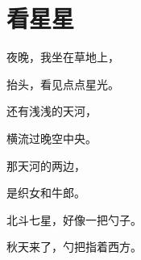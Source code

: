 \documentclass[12pt,UTF-8,openany]{ctexbook}
\begin{document}
\hanzibox{}\hanzibox{}\hanzibox{}\hanzibox{}\hspace{1em}\hanzibox{}\hanzibox{}\hanzibox{}\hanzibox{}

\hanzibox{}\hanzibox{}\hanzibox{}\hanzibox{}\hspace{1em}\hanzibox{}\hanzibox{}\hanzibox{}\hanzibox{}






\chapter{看星星}

\begin{large}
    
    夜晚，我坐在草地上，
    
    抬头，看见点点星光。
    
    还有浅浅的天河，
    
    横流过晚空中央。
    
    那天河的两边，
    
    是织女和牛郎。
    
    北斗七星，好像一把勺子。
    
    秋天来了，勺把指着西方。
    
\end{large}


\clearpage

\begin{center}
    
    
\end{center}


\hanzibox{}\hanzibox{}\hanzibox{}\hanzibox{}\hspace{1em}\hanzibox{}\hanzibox{}\hanzibox{}\hanzibox{}

\hanzibox{}\hanzibox{}\hanzibox{}\hanzibox{}\hspace{1em}\hanzibox{}\hanzibox{}\hanzibox{}\hanzibox{}

\hanzibox{}\hanzibox{}\hanzibox{}\hanzibox{}\hspace{1em}\hanzibox{}\hanzibox{}\hanzibox{}\hanzibox{}

\hanzibox{}\hanzibox{}\hanzibox{}\hanzibox{}\hspace{1em}
\end{document}
